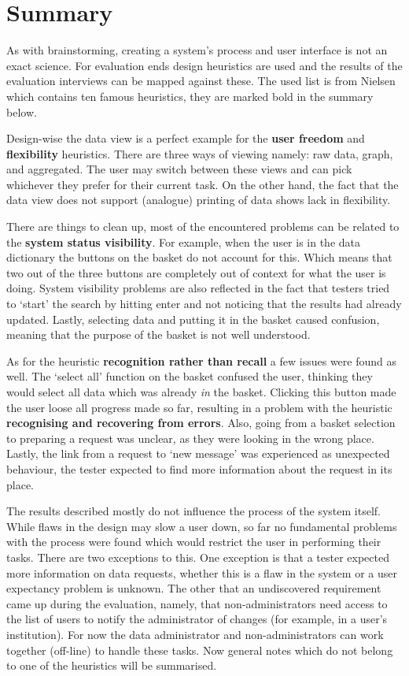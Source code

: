 \section{Summary}
\label{evaluation-summary}

As with brainstorming, creating a system's process and user interface is not an exact science.
For evaluation ends design heuristics are used and the results of the evaluation interviews can be mapped against these.
The used list is from Nielsen \cite{designHeuristics} which contains ten famous heuristics, they are marked bold in the summary below.

Design-wise the data view is a perfect example for the \textbf{user freedom} and \textbf{flexibility} heuristics.
There are three ways of viewing namely: raw data, graph, and aggregated.
The user may switch between these views and can pick whichever they prefer for their current task.
On the other hand, the fact that the data view does not support (analogue) printing of data shows lack in flexibility.

There are things to clean up, most of the encountered problems can be related to the \textbf{system status visibility}.
For example, when the user is in the data dictionary the buttons on the basket do not account for this.
Which means that two out of the three buttons are completely out of context for what the user is doing.
System visibility problems are also reflected in the fact that testers tried to `start' the search by hitting enter and not noticing that the results had already updated.
Lastly, selecting data and putting it in the basket caused confusion, meaning that the purpose of the basket is not well understood.

As for the heuristic \textbf{recognition rather than recall} a few issues were found as well.
The `select all' function on the basket confused the user, thinking they would select all data which was already \emph{in} the basket.
Clicking this button made the user loose all progress made so far, resulting in a problem with the heuristic \textbf{recognising and recovering from errors}.
Also, going from a basket selection to preparing a request was unclear, as they were looking in the wrong place.
Lastly, the link from a request to `new message' was experienced as unexpected behaviour, the tester expected to find more information about the request in its place.

The results described mostly do not influence the process of the system itself.
While flaws in the design may slow a user down, so far no fundamental problems with the process were found which would restrict the user in performing their tasks.
There are two exceptions to this.
One exception is that a tester expected more information on data requests, whether this is a flaw in the system or a user expectancy problem is unknown.
The other that an undiscovered requirement came up during the evaluation, namely, that non-administrators need access to the list of users to notify the administrator of changes (for example, in a user's institution).
For now the data administrator and non-administrators can work together (off-line) to handle these tasks.
Now general notes which do not belong to one of the heuristics will be summarised.

